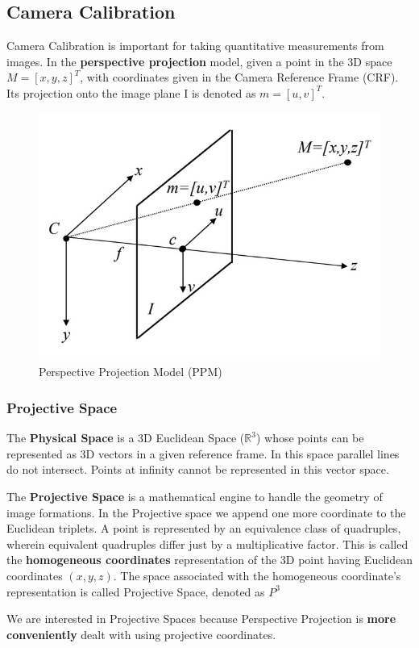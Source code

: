 \documentclass{article}
\begin{document}
\subsection{Camera Calibration}

Camera Calibration is important for taking quantitative measurements from images.
In the \textbf{perspective projection} model, given a point in the 3D space $M = [x,y,z]^T$, with coordinates given in the Camera Reference Frame (CRF).
Its projection onto the image plane I is denoted as $m=[u,v]^T$.

\begin{figure}[htbp]
  \centering
  \includegraphics[width=0.5\linewidth]{./img/camera_calibration.jpg}
  \caption{Perspective Projection Model (PPM)}
  \label{fig:camera calibration}
\end{figure}

\subsubsection{Projective Space}

The \textbf{Physical Space} is a 3D Euclidean Space ($\mathbb{R}^3$) whose points can be represented as 3D vectors in a given reference frame.
In this space parallel lines do not intersect.
Points at infinity cannot be represented in this vector space.

The \textbf{Projective Space} is a mathematical engine to handle the geometry of image formations.
In the Projective space we append one more coordinate to the Euclidean triplets.
A point is represented by an equivalence class of quadruples, wherein equivalent quadruples differ just by a multiplicative factor.
This is called the \textbf{homogeneous coordinates} representation of the 3D point having Euclidean coordinates $(x,y,z)$.
The space associated with the homogeneous coordinate's representation is called Projective Space, denoted as $P^3$

\vspace{0.6em}
We are interested in Projective Spaces because Perspective Projection is \textbf{more conveniently} dealt with using projective coordinates.
\vspace{0.6em}
\end{document}
